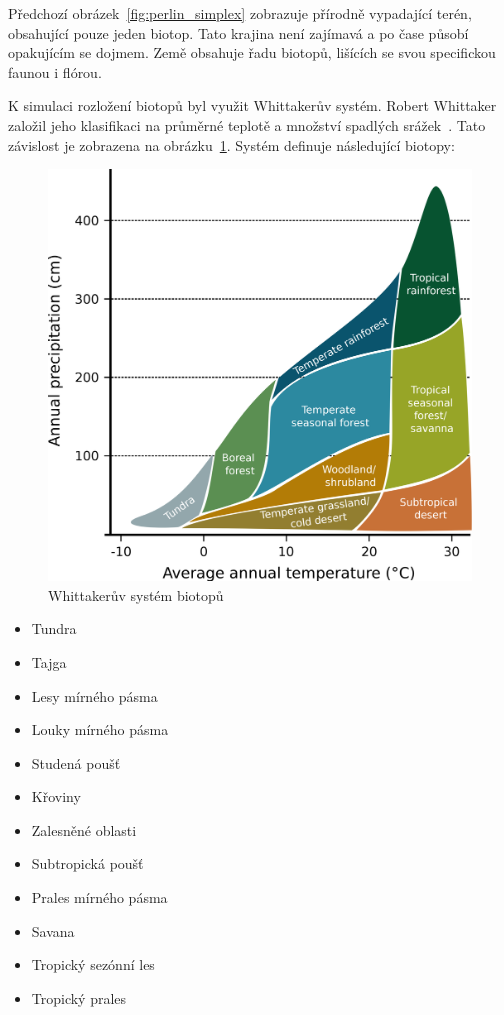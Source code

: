 \documentclass[thesis=M,czech]{FITthesis}[2019/12/23]
\begin{document}
Předchozí obrázek~\ref{fig:perlin_simplex} zobrazuje přírodně vypadající terén, obsahující pouze jeden biotop. Tato krajina není zajímavá a po čase působí opakujícím se dojmem. Země obsahuje řadu biotopů, lišících se svou specifickou faunou i flórou. 

K simulaci rozložení biotopů byl využit Whittakerův systém. Robert Whittaker založil jeho klasifikaci na průměrné teplotě a množství spadlých srážek~\cite{whitt}. Tato závislost je zobrazena na obrázku~\ref{fig:whitt_biomes}. Systém definuje následující biotopy:

\begin{figure}\centering
	\includegraphics[width=\textwidth]{images/world_gen/whitt_biomes}
	\caption[Whittakerův systém biotopů]{Whittakerův systém biotopů~\cite{whitt_image}}\label{fig:whitt_biomes}
\end{figure}

\begin{itemize}
\item Tundra
\item Tajga
\item Lesy mírného pásma
\item Louky mírného pásma
\item Studená poušť
\item Křoviny
\item Zalesněné oblasti
\item Subtropická poušť
\item Prales mírného pásma
\item Savana
\item Tropický sezónní les
\item Tropický prales
\end{itemize}
\end{document}
